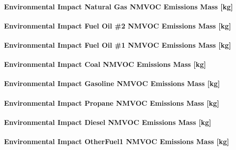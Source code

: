 \paragraph{Environmental Impact Natural Gas NMVOC Emissions Mass {[}kg{]}}\label{environmental-impact-natural-gas-nmvoc-emissions-mass-kg}

\paragraph{Environmental Impact Fuel Oil \#2 NMVOC Emissions Mass {[}kg{]}}\label{environmental-impact-fuel-oil-2-nmvoc-emissions-mass-kg}

\paragraph{Environmental Impact Fuel Oil \#1 NMVOC Emissions Mass {[}kg{]}}\label{environmental-impact-fuel-oil-1-nmvoc-emissions-mass-kg}

\paragraph{Environmental Impact Coal NMVOC Emissions Mass {[}kg{]}}\label{environmental-impact-coal-nmvoc-emissions-mass-kg}

\paragraph{Environmental Impact Gasoline NMVOC Emissions Mass {[}kg{]}}\label{environmental-impact-gasoline-nmvoc-emissions-mass-kg}

\paragraph{Environmental Impact Propane NMVOC Emissions Mass {[}kg{]}}\label{environmental-impact-propane-nmvoc-emissions-mass-kg}

\paragraph{Environmental Impact Diesel NMVOC Emissions Mass {[}kg{]}}\label{environmental-impact-diesel-nmvoc-emissions-mass-kg}

\paragraph{Environmental Impact OtherFuel1 NMVOC Emissions Mass {[}kg{]}}\label{environmental-impact-otherfuel1-nmvoc-emissions-mass-kg}

